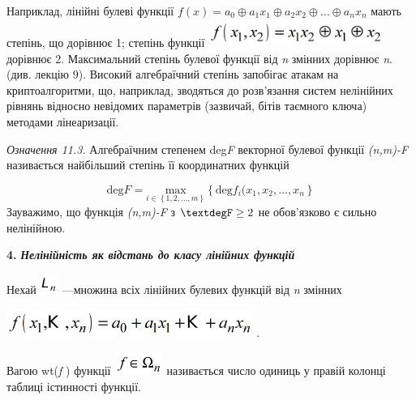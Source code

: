 Наприклад, лінійні булеві функції  
$f(x)=a_{0}{\oplus}a_{1}x_{1}{\oplus}a_{2}x_{2}{\oplus}\dots{\oplus}a_{n}x_n$
мають степінь, що дорівнює 1; степінь функції 
\includegraphics[width=2.248in,height=0.3583in]{crypt-img/crypt-img258.png}  
дорівнює  2. Максимальний степінь булевої функції від \textit{n} змінних
дорівнює \textit{n}. (див. лекцію 9). Високий алгебраїчний степінь запобігає
атакам на криптоалгоритми, що, наприклад, зводяться до розв’язання систем
нелінійних рівнянь відносно невідомих параметрів (зазвичай, бітів таємного
ключа) методами лінеаризації. 

 \textit{Означення 11.3.} Алгебраїчним степенем deg\textit{F}\textit{ }
векторної булевої функції 
\textit{(}\textit{n}\textit{,}\textit{m}\textit{)-}\textit{F}\textit{ 
}називається найбільший степінь її координатних функцій

\begin{equation*}
{\text{deg}F=\underset{{i\in
\left\{ 1,2,\dots,m \right\}}}{\text{max}}\left\{ \text{deg}f_{i}(x_{1},x_{2},\dots,x_{n} \right\}}
\end{equation*}
Зауважимо, що функція
\textit{(}\textit{n}\textit{,}\textit{m}\textit{)-}\textit{F}\textit{ } з 
$\textdegF\ge 2$ не обов’язково є сильно нелінійною.


\bigskip

\textbf{4.} \textbf{\textit{Нелінійність як відстань до класу лінійних функцій}}

Нехай 
\includegraphics[width=0.2362in,height=0.25in]{crypt-img/crypt-img259.png} 
---множина всіх лінійних булевих функцій від \textit{n}\textit{ }змінних 

{\centering
 \includegraphics[width=3.1618in,height=0.3693in]{crypt-img/crypt-img260.png} .
\par}

 Вагою wt(\textit{f}\textit{ })\textit{ }функції 
\includegraphics[width=0.6217in,height=0.2874in]{crypt-img/crypt-img261.png} 
називається число одиниць у правій колонці таблиці істинності функції.

